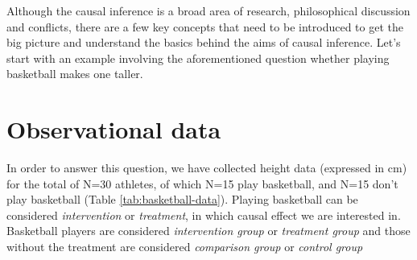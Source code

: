 \documentclass[
]{book}
\begin{document}
Although the causal inference is a broad area of research, philosophical discussion and conflicts, there are a few key concepts that need to be introduced to get the big picture and understand the basics behind the aims of causal inference. Let's start with an example involving the aforementioned question whether playing basketball makes one taller.

\hypertarget{observational-data}{%
\section{Observational data}\label{observational-data}}

In order to answer this question, we have collected height data (expressed in cm) for the total of N=30 athletes, of which N=15 play basketball, and N=15 don't play basketball (Table \ref{tab:basketball-data}). Playing basketball can be considered \emph{intervention} or \emph{treatment}, in which causal effect we are interested in. Basketball players are considered \emph{intervention group} or \emph{treatment group} and those without the treatment are considered \emph{comparison group} or \emph{control group}
\end{document}
